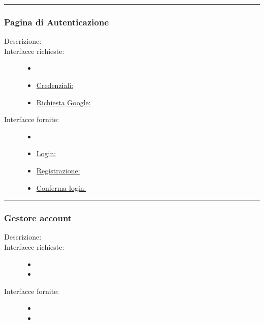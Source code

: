 \documentclass[11pt, a4paper]{article}
\theoremstyle{definition} %
\begin{document}
\begin{center}
    \rule{5cm}{1pt}
\end{center}

\subsubsection{Pagina di Autenticazione}
\begin{description}
    \item[Descrizione:]

    \item[Interfacce richieste:]
    \begin{itemize}
        \item[]

        \item \underline{Credenziali:}
        \item \underline{Richiesta Google:}
    \end{itemize}

    \item[Interfacce fornite:]
    \begin{itemize}
        \item[]

        \item \underline{Login:}
        \item \underline{Registrazione:}
        \item \underline{Conferma login:}
    \end{itemize}
\end{description}

\begin{center}
    \rule{5cm}{1pt}
\end{center}

\subsubsection{Gestore account}
\begin{description}
    \item[Descrizione:]

    \item[Interfacce richieste:]
    \begin{itemize}
        \item[]

        \item
    \end{itemize}

    \item[Interfacce fornite:]
    \begin{itemize}
        \item[]

        \item
    \end{itemize}
\end{description}
\end{document}
